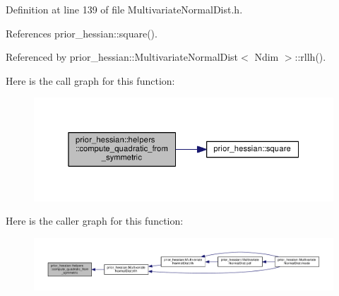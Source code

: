 Definition at line 139 of file Multivariate\+Normal\+Dist.\+h.



References prior\+\_\+hessian\+::square().



Referenced by prior\+\_\+hessian\+::\+Multivariate\+Normal\+Dist$<$ Ndim $>$\+::rllh().



Here is the call graph for this function\+:\nopagebreak
\begin{figure}[H]
\begin{center}
\leavevmode
\includegraphics[width=345pt]{namespaceprior__hessian_1_1helpers_a5d1bbe705c849e9c225a831c853be8a7_cgraph}
\end{center}
\end{figure}




Here is the caller graph for this function\+:\nopagebreak
\begin{figure}[H]
\begin{center}
\leavevmode
\includegraphics[width=350pt]{namespaceprior__hessian_1_1helpers_a5d1bbe705c849e9c225a831c853be8a7_icgraph}
\end{center}
\end{figure}


